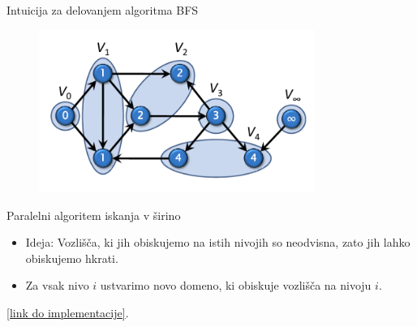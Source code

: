 \documentclass{beamer}
\begin{document}
\begin{frame}{Intuicija za delovanjem algoritma BFS}
    \begin{figure}
        \centering
        \includegraphics[width=9cm]{slike/parallel_bfs/pbfs_graph_by_levels.png}
        \label{fig:pbfs_graph_example}
    \end{figure}
\end{frame}

\begin{frame}{Paralelni algoritem iskanja v širino}
    \begin{itemize}
        \item Ideja: Vozlišča, ki jih obiskujemo na istih nivojih so neodvisna, zato jih lahko obiskujemo hkrati.
        \item Za vsak nivo $i$ ustvarimo novo domeno, ki obiskuje vozlišča na nivoju $i$.
    \end{itemize}
    \href{https://github.com/tjazerzen/parallelisation-of-graph-algorithms-in-functional-programming-languages/blob/parallel_BFS/playground/graph/bfs.ml}{[link do implementacije]}.
\end{frame}
\end{document}
